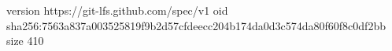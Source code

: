 version https://git-lfs.github.com/spec/v1
oid sha256:7563a837a003525819f9b2d57cfdeecc204b174da0d3c574da80f60f8c0df2bb
size 410
